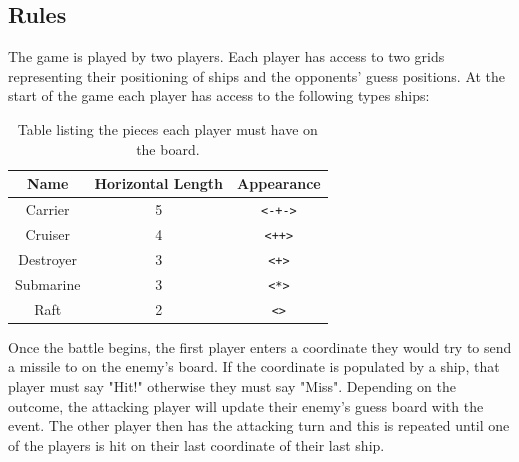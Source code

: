 \documentclass[11pt]{article} %
\begin{document}
\subsection{Rules}
The game is played by two players.
Each player has access to two grids representing their positioning of ships and the opponents' guess positions.
At the start of the game each player has access to the following types ships:
\begin{table}[!h]
\centering
\begin{tabular}{c|c|c}
Name & Horizontal Length & Appearance \\
\hline
Carrier & 5 & \verb|<-+->| \\
Cruiser & 4 & \verb|<++>| \\
Destroyer & 3 & \verb|<+>| \\
Submarine & 3 & \verb|<*>| \\
Raft & 2 & \verb|<>| \\
\hline
\end{tabular}
\caption{Table listing the pieces each player must have on the board.}
\label{table:pieces}
\end{table}
Once the battle begins, the first player enters a coordinate they would try to send a missile to on the
enemy's board.
If the coordinate is populated by a ship, that player must say "Hit!" otherwise they must say "Miss".
Depending on the outcome, the attacking player will update their enemy's guess board with the event.
The other player then has the attacking turn and this is repeated until one of the players is hit on their last
coordinate of their last ship.
\end{document}

